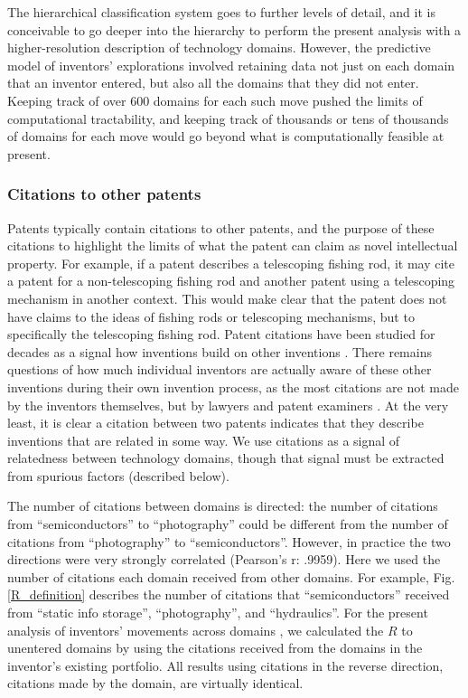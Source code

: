 \documentclass{dsj}
\begin{document}
The hierarchical classification system goes to further levels of detail, and it is conceivable to go deeper into the hierarchy to perform the present analysis with a higher-resolution description of technology domains. However, the predictive model of inventors' explorations involved retaining data not just on each domain that an inventor entered, but also all the domains that they did not enter. Keeping track of over 600 domains for each such move pushed the limits of computational tractability, and keeping track of thousands or tens of thousands of domains for each move would go beyond what is computationally feasible at present. 


\subsubsection*{Citations to other patents}
Patents typically contain citations to other patents, and the purpose of these citations to highlight the limits of what the patent can claim as novel intellectual property. For example, if a patent describes a telescoping fishing rod, it may cite a patent for a non-telescoping fishing rod and another patent using a telescoping mechanism in another context. This would make clear that the patent does not have claims to the ideas of fishing rods or telescoping mechanisms, but to specifically the telescoping fishing rod. Patent citations have been studied for decades as a signal how inventions build on other inventions \cite{Jaffe2016}. There remains questions of how much individual inventors are actually aware of these other inventions during their own invention process, as the most citations are not made by the inventors themselves, but by lawyers and patent examiners \cite{Alcacer2006, Criscuolo2008}. At the very least, it is clear a citation between two patents indicates that they describe inventions that are related in some way. We use citations as a signal of relatedness between technology domains, though that signal must be extracted from spurious factors  (described below).%

The number of citations between domains is directed: the number of citations from ``semiconductors'' to ``photography'' could be different from the number of citations from ``photography'' to ``semiconductors''. However, in practice the two directions were very strongly correlated (Pearson's r: .9959). Here we used the number of citations each domain received from other domains. For example, Fig. \ref{R_definition} describes the number of citations that ``semiconductors'' received from ``static info storage'', ``photography'', and ``hydraulics''. For the present analysis of inventors' movements across domains , we calculated the $R$ to unentered domains by using the citations received from the domains in the inventor's existing portfolio. 
All results using citations in the reverse direction, citations made by the domain, are virtually identical. 
\end{document}
